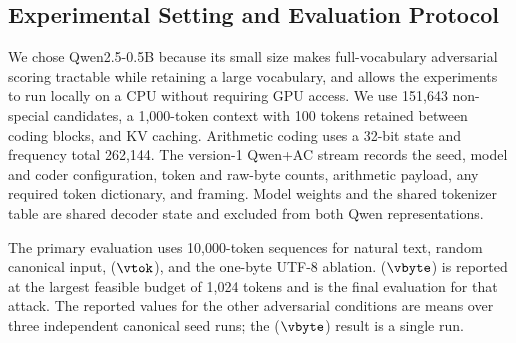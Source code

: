 \begin{center}
\end{center}


\newpage

\subsection{Experimental Setting and Evaluation Protocol}
\label{app:experimental-details}

 We chose Qwen2.5-0.5B because its small size makes full-vocabulary adversarial scoring tractable while retaining a large vocabulary, and allows the experiments to run locally on a CPU without requiring GPU access. We use 151,643 non-special candidates, a 1,000-token context with 100 tokens retained between coding blocks, and KV caching. Arithmetic coding uses a 32-bit state and frequency total 262,144. The version-1 Qwen+AC stream records the seed, model and coder configuration, token and raw-byte counts, arithmetic payload, any required token dictionary, and framing. Model weights and the shared tokenizer table are shared decoder state and excluded from both Qwen representations.

The primary evaluation uses 10,000-token sequences for natural text, random canonical input, \MinProb{} ($\vtok$), and the one-byte UTF-8 ablation. \MaxSurprisal{} ($\vbyte$) is reported at the largest feasible budget of 1,024 tokens and is the final evaluation for that attack. The reported values for the other adversarial conditions are means over three independent canonical seed runs; the \MaxSurprisal{} ($\vbyte$) result is a single run.


